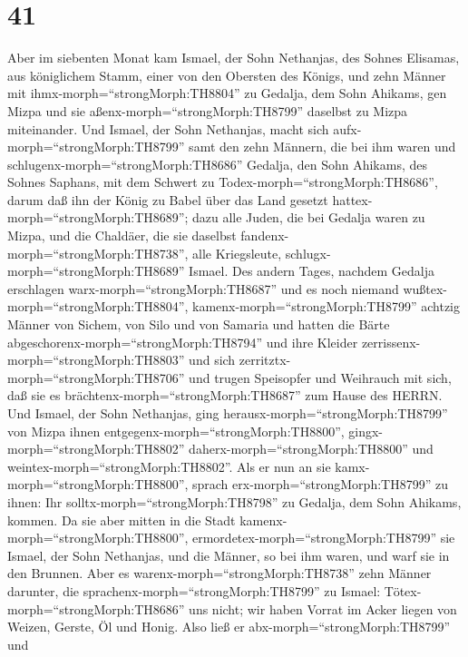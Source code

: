 \hypertarget{section-40}{%
\section{41}\label{section-40}}

 Aber im siebenten Monat kam Ismael, der Sohn Nethanjas, des
Sohnes Elisamas, aus königlichem Stamm, einer von den Obersten des
Königs, und zehn Männer mit ihmx-morph=``strongMorph:TH8804'' zu
Gedalja, dem Sohn Ahikams, gen Mizpa und sie
aßenx-morph=``strongMorph:TH8799'' daselbst zu Mizpa miteinander.
 Und Ismael, der Sohn Nethanjas, macht sich
aufx-morph=``strongMorph:TH8799'' samt den zehn Männern, die bei ihm
waren und schlugenx-morph=``strongMorph:TH8686'' Gedalja, den Sohn
Ahikams, des Sohnes Saphans, mit dem Schwert zu
Todex-morph=``strongMorph:TH8686'', darum daß ihn der König zu Babel
über das Land gesetzt hattex-morph=``strongMorph:TH8689''; 
dazu alle Juden, die bei Gedalja waren zu Mizpa, und die Chaldäer, die
sie daselbst fandenx-morph=``strongMorph:TH8738'', alle Kriegsleute,
schlugx-morph=``strongMorph:TH8689'' Ismael.  Des andern
Tages, nachdem Gedalja erschlagen warx-morph=``strongMorph:TH8687'' und
es noch niemand wußtex-morph=``strongMorph:TH8804'', 
kamenx-morph=``strongMorph:TH8799'' achtzig Männer von Sichem, von Silo
und von Samaria und hatten die Bärte
abgeschorenx-morph=``strongMorph:TH8794'' und ihre Kleider
zerrissenx-morph=``strongMorph:TH8803'' und sich
zerritztx-morph=``strongMorph:TH8706'' und trugen Speisopfer und
Weihrauch mit sich, daß sie es brächtenx-morph=``strongMorph:TH8687''
zum Hause des HERRN.  Und Ismael, der Sohn Nethanjas, ging
herausx-morph=``strongMorph:TH8799'' von Mizpa ihnen
entgegenx-morph=``strongMorph:TH8800'',
gingx-morph=``strongMorph:TH8802'' daherx-morph=``strongMorph:TH8800''
und weintex-morph=``strongMorph:TH8802''. Als er nun an sie
kamx-morph=``strongMorph:TH8800'', sprach
erx-morph=``strongMorph:TH8799'' zu ihnen: Ihr
solltx-morph=``strongMorph:TH8798'' zu Gedalja, dem Sohn Ahikams,
kommen.  Da sie aber mitten in die Stadt
kamenx-morph=``strongMorph:TH8800'',
ermordetex-morph=``strongMorph:TH8799'' sie Ismael, der Sohn Nethanjas,
und die Männer, so bei ihm waren, und warf sie in den Brunnen.
 Aber es warenx-morph=``strongMorph:TH8738'' zehn Männer
darunter, die sprachenx-morph=``strongMorph:TH8799'' zu Ismael:
Tötex-morph=``strongMorph:TH8686'' uns nicht; wir haben Vorrat im Acker
liegen von Weizen, Gerste, Öl und Honig. Also ließ er
abx-morph=``strongMorph:TH8799'' und
